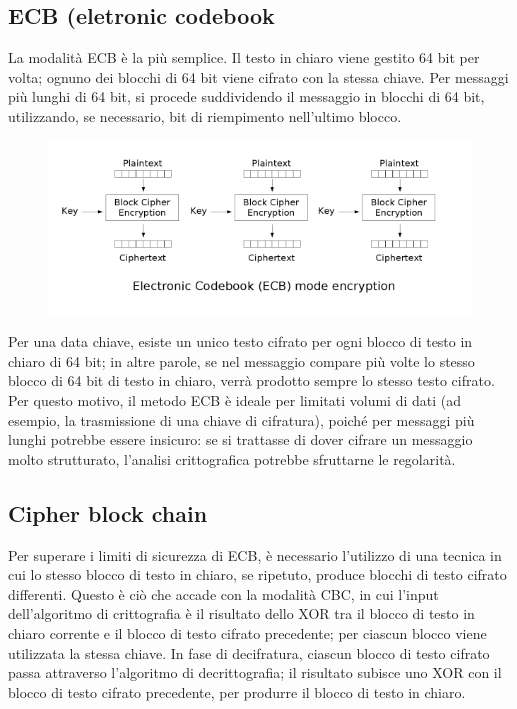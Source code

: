 \documentclass[10pt,a4paper]{article}
\begin{document}
\subsection{ECB (eletronic codebook}
La modalità ECB è la più semplice. Il testo in chiaro viene gestito 64 bit per volta; ognuno dei blocchi di 64 bit viene cifrato con la stessa chiave. Per messaggi più lunghi di 64 bit, si procede suddividendo il messaggio in blocchi di 64 bit, utilizzando, se necessario, bit di riempimento nell'ultimo blocco.

\begin{figure}[htbp]
\includegraphics[scale=0.6]{immagini/ecb.png}
\end{figure}

Per una data chiave, esiste un unico testo cifrato per ogni blocco di testo in chiaro di 64 bit; in altre parole, se nel messaggio compare più volte lo stesso blocco di 64 bit di testo in chiaro, verrà prodotto sempre lo stesso testo cifrato. Per questo motivo, il metodo ECB è ideale per limitati volumi di dati (ad esempio, la trasmissione di una chiave di cifratura), poiché per messaggi più lunghi potrebbe essere insicuro: se si trattasse di dover cifrare un messaggio molto strutturato, l'analisi crittografica potrebbe sfruttarne le regolarità.

\subsection{Cipher block chain}
Per superare i limiti di sicurezza di ECB, è necessario l'utilizzo di una tecnica in cui lo stesso blocco di testo in chiaro, se ripetuto, produce blocchi di testo cifrato differenti. Questo è ciò che accade con la modalità CBC, in cui l'input dell'algoritmo di crittografia è il risultato dello XOR tra il blocco di testo in chiaro corrente e il blocco di testo cifrato precedente; per ciascun blocco viene utilizzata la stessa chiave.
In fase di decifratura, ciascun blocco di testo cifrato passa attraverso l'algoritmo di decrittografia; il risultato subisce uno XOR con il blocco di testo cifrato precedente, per produrre il blocco di testo in chiaro.
\end{document}
